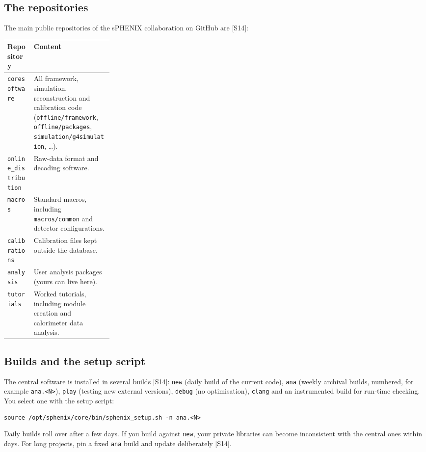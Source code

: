 \documentclass[11pt,letterpaper]{article}
\begin{document}
\subsection{The repositories}
The main public repositories of the sPHENIX collaboration on GitHub are [S14]:
{\small\par\noindent\begin{tabularx}{\linewidth}{@{}>{\raggedright\arraybackslash}p{0.25\linewidth}X@{}}\toprule
Repository & Content \\\midrule
\texttt{coresoftware} & All framework, simulation, reconstruction and calibration code (\texttt{offline/framework}, \texttt{offline/packages}, \texttt{simulation/g4simulation}, \dots). \\
\texttt{online\_distribution} & Raw-data format and decoding software. \\
\texttt{macros} & Standard macros, including \texttt{macros/common} and detector configurations. \\
\texttt{calibrations} & Calibration files kept outside the database. \\
\texttt{analysis} & User analysis packages (yours can live here). \\
\texttt{tutorials} & Worked tutorials, including module creation and calorimeter data analysis. \\\bottomrule
\end{tabularx}}

\subsection{Builds and the setup script}
The central software is installed in several builds [S14]:
\texttt{new} (daily build of the current code), \texttt{ana} (weekly archival builds, numbered, for example \texttt{ana.<N>}),
\texttt{play} (testing new external versions), \texttt{debug} (no optimisation), \texttt{clang} and an instrumented build for run-time checking.
You select one with the setup script:
{\footnotesize\begin{verbatim}
source /opt/sphenix/core/bin/sphenix_setup.sh -n ana.<N>
\end{verbatim}}
Daily builds roll over after a few days. If you build against \texttt{new}, your private libraries can become inconsistent with the central ones within days.
For long projects, pin a fixed \texttt{ana} build and update deliberately [S14].
\end{document}
